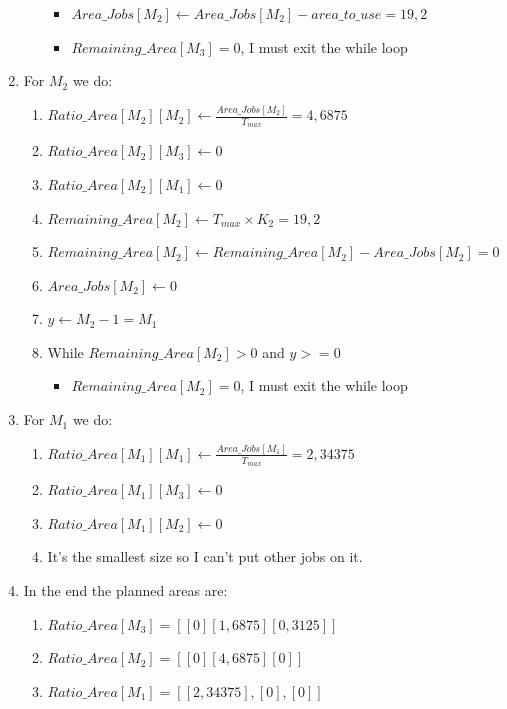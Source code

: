 \documentclass[a4paper]{article}
\begin{document}
\begin{enumerate}
\begin{enumerate}
\begin{itemize}
			\item $Area\_Jobs[M_2] \gets Area\_Jobs[M_2] - area\_to\_use = 19,2$
			\item $Remaining\_Area[M_3] = 0$, I must exit the while loop
		\end{itemize}
	\end{enumerate}
	\item For $M_2$ we do:
	\begin{enumerate}
		\item $Ratio\_Area[M_2][M_2] \gets \frac{Area\_Jobs[M_2]}{T_{max}} = 4,6875$
		\item $Ratio\_Area[M_2][M_3] \gets 0$
		\item $Ratio\_Area[M_2][M_1] \gets 0$
		\item $Remaining\_Area[M_2] \gets T_{max} \times K_2 = 19,2$
		\item $Remaining\_Area[M_2] \gets Remaining\_Area[M_2] - Area\_Jobs[M_2] = 0$
		\item $Area\_Jobs[M_2] \gets 0$
		\item $y \gets M_2 - 1 = M_1$
		\item While $Remaining\_Area[M_2]>0$ and $y>=0$
		\begin{itemize}
			\item $Remaining\_Area[M_2] = 0$, I must exit the while loop
		\end{itemize}
	\end{enumerate}
	\item For $M_1$ we do:
	\begin{enumerate}
		\item $Ratio\_Area[M_1][M_1] \gets \frac{Area\_Jobs[M_1]}{T_{max}} = 2,34375$
		\item $Ratio\_Area[M_1][M_3] \gets 0$
		\item $Ratio\_Area[M_1][M_2] \gets 0$
		\item It's the smallest size so I can't put other jobs on it.
	\end{enumerate}
	\item In the end the planned areas are:
	\begin{enumerate}
		\item $Ratio\_Area[M_3] = [[0] [1,6875] [0,3125]]$
		\item $Ratio\_Area[M_2] = [[0] [4,6875] [0]]$
		\item $Ratio\_Area[M_1] = [[2,34375], [0], [0]]$
	\end{enumerate}
\end{enumerate}
\end{document}
